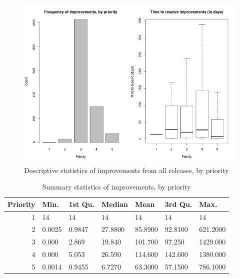 \documentclass[a4paper]{scrartcl}
\begin{document}
\begin{figure}
\begin{center}
\includegraphics[width=6in]{exploratory_results/mongodb_allreleases/improvements}
\caption{Descriptive statistics of improvements from all releases, by priority}
\label{fig:all_improvements}
\end{center}
\end{figure}

\begin{table}[h!]
\caption{Summary statistics of improvements, by priority}
\centering
\begin{tabular}{ r | l | l | l | l |  l | l }
\hline
Priority & Min. & 1st Qu. & Median & Mean & 3rd Qu. & Max. \\
\hline\hline
1 & 14 & 14 & 14 & 14 & 14 & 14 \\
2 & 0.0025 & 0.9847 & 27.8800 & 85.8900 & 92.8100 & 621.2000 \\
3 & 0.000 & 2.869 & 19.840 & 101.700 & 97.250 & 1429.000 \\
4 & 0.000 & 5.053 & 26.590 & 114.600 & 142.600 & 1380.000 \\
5 & 0.0014 & 0.9455 & 6.7270 & 63.3000 & 57.1500 & 786.1000 \\
\hline
\end{tabular}
\label{tab:all_improvements_summary}
\end{table}
\end{document}
